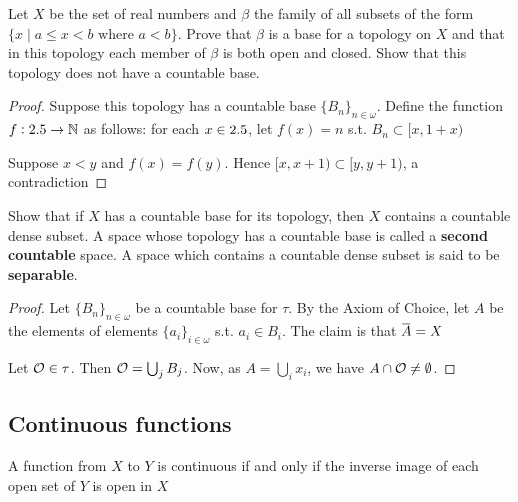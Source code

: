 \documentclass[11pt]{article}
\begin{document}
\begin{exercise}
\label{ex2.1.11}
Let \(X\) be the set of real numbers and \(\beta\) the family of all subsets of the
form \(\{x\mid a\le x<b\text{ where }a<b\}\). Prove that \(\beta\) is a base for a
topology on \(X\) and that in this topology each member of \(\beta\) is both open
and closed. Show that this topology does not have a countable base.
\end{exercise}

\begin{proof}
Suppose this topology has a countable base \(\{B_n\}_{n\in\omega}\). Define
the function \(f:2.5\to\mathbb{N}\) as follows: for each \(x\in2.5\), let \(f(x)=n\)
s.t. \(B_n\subset[x,1+x)\)

Suppose \(x<y\) and \(f(x)=f(y)\). Hence \([x,x+1)\subset[y,y+1)\), a
contradiction 
\end{proof}

\begin{exercise}
\label{ex2.1.12}
Show that if \(X\) has a countable base for its topology, then \(X\)
contains a countable dense subset. A space whose topology has a countable
base is called a \textbf{second countable} space. A space which contains a countable
dense subset is said to be \textbf{separable}.
\end{exercise}

\begin{proof}
Let \(\{B_n\}_{n\in\omega}\) be a countable base for \(\tau\).  By the Axiom of
Choice, let \(A\) be the elements of elements \(\{a_i\}_{i\in\omega}\) s.t.
\(a_i\in B_i\). The claim is that \(\bbar{A}=X\)

Let \(\mathcal{O}\in\tau\). Then \(\mathcal{O}=\bigcup_jB_j\). Now, as
\(A=\bigcup_ix_i\), we have \(A\cap\mathcal{O}\neq\emptyset\).
\end{proof}
























\subsection{Continuous functions}
\label{sec:orgc0847c8}
\begin{theorem}[]
\label{thm2.6}
A function from \(X\) to \(Y\) is continuous if and only if the inverse image
of each open set of \(Y\) is open in \(X\)
\end{theorem}
\end{document}
